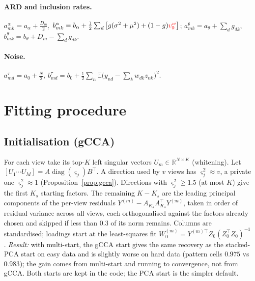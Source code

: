 \documentclass[11pt,a4paper]{article}
\newcommand{\new}[1]{{\color{red}#1}}
\newcommand{\E}{\mathbb{E}}
\newcommand{\diag}{\operatorname{diag}}
\theoremstyle{definition}
\theoremstyle{remark}
\begin{document}
\paragraph{ARD and inclusion rates.}
$a^\alpha_{mk}=a_\alpha+\tfrac{D_m}{2}$, $b^\alpha_{mk}=b_\alpha+\tfrac12\sum_d\big[g(\sigma^2+\mu^2)+(1-g)\new{v^w_0}\big]$;\quad
$a^\theta_{mk}=a_\theta+\sum_dg_{dk}$, $b^\theta_{mk}=b_\theta+D_m-\sum_dg_{dk}$.

\paragraph{Noise.} $a^\tau_{md}=a_0+\tfrac N2$, $b^\tau_{md}=b_0+\tfrac12\sum_n\E\big(y_{nd}-\sum_kw_{dk}z_{nk}\big)^2$.

\section{Fitting procedure}\label{sec:fit}
\subsection{Initialisation (gCCA)}\label{sec:init}
For each view take its top-$K$ left singular vectors $U_m\in\mathbb R^{N\times K}$ (whitening). Let
$[U_1\cdots U_M]=A\diag(\varsigma_j)B^\top$. A direction used by $v$ views has $\varsigma_j^2\approx v$, a private one $\varsigma_j^2\approx1$
(Proposition~\ref{prop:gcca}). Directions with $\varsigma_j^2\ge1.5$ (at most $K$) give the first $K_s$ starting factors. The
remaining $K-K_s$ are the leading principal components of the per-view residuals $Y^{(m)}-A_{K_s}A_{K_s}^\top Y^{(m)}$, taken in
order of residual variance across all views, each orthogonalised against the factors already chosen and skipped if less
than $0.3$ of its norm remains. Columns are standardised; loadings start at the least-squares fit
$W^{(m)}_0=Y^{(m)\top}Z_0(Z_0^\top Z_0)^{-1}$.
\emph{Result:} with multi-start, the gCCA start gives the same recovery as the stacked-PCA start on easy data and is
slightly worse on hard data (pattern cells $0.975$ vs $0.983$); the gain comes from multi-start and running to
convergence, not from gCCA. Both starts are kept in the code; the PCA start is the simpler default.
\end{document}
